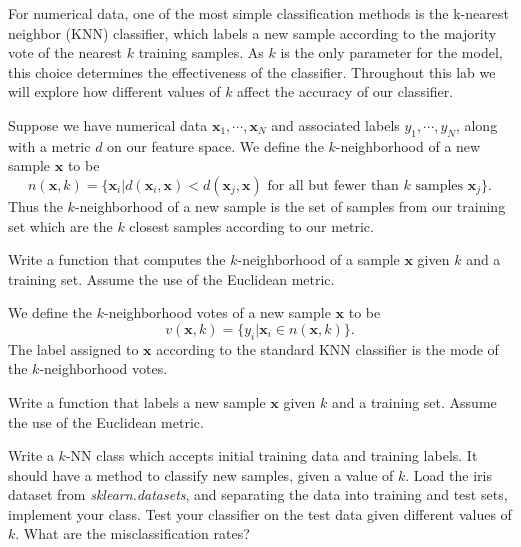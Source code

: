 

For numerical data, one of the most simple classification methods is the k-nearest neighbor (KNN) classifier, which labels a new sample according to the majority vote of the nearest $k$ training samples. As $k$ is the only parameter for the model, this choice determines the effectiveness of the classifier. Throughout this lab we will explore how different values of $k$ affect the accuracy of our classifier.

Suppose we have numerical data $\mathbf{x}_{1}, \cdots, \mathbf{x}_{N}$ and associated labels $y_{1}, \cdots, y_{N}$, along with a metric $d$ on our feature space. We define the $k$-neighborhood of a new sample $\mathbf{x}$ to be $$n(\mathbf{x},k) = \{\mathbf{x}_{i} | d(\mathbf{x}_{i}, \mathbf{x}) < d(\mathbf{x}_{j}, \mathbf{x}) \text{ for all but fewer than } k \text{ samples } \mathbf{x}_{j}\}.$$ Thus the $k$-neighborhood of a new sample is the set of samples from our training set which are the $k$ closest samples according to our metric.

\begin{problem}
Write a function that computes the $k$-neighborhood of a sample $\mathbf{x}$ given $k$ and a training set. Assume the use of the Euclidean metric.
\end{problem}

We define the $k$-neighborhood votes of a new sample $\mathbf{x}$ to be $$v(\mathbf{x},k) = \{y_{i} | \mathbf{x}_{i} \in n(\mathbf{x},k)\}.$$ The label assigned to $\mathbf{x}$ according to the standard KNN classifier is the mode of the $k$-neighborhood votes.

\begin{problem}
Write a function that labels a new sample $\mathbf{x}$ given $k$ and a training set. Assume the use of the Euclidean metric.
\end{problem}

\begin{problem}
Write a $k$-NN class which accepts initial training data and training labels. It should have a method to classify new samples, given a value of $k$. Load the iris dataset from \emph{sklearn.datasets}, and separating the data into training and test sets, implement your class. Test your classifier on the test data given different values of $k$. What are the misclassification rates?
\end{problem}

